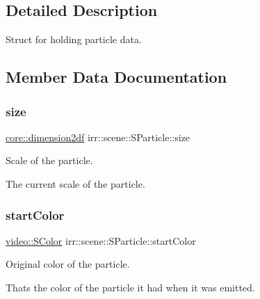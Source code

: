 \subsection{Detailed Description}
Struct for holding particle data. 

\subsection{Member Data Documentation}
\mbox{\label{structirr_1_1scene_1_1SParticle_a548dc843e9db5db26e0005a2cb29a609}} 
\subsubsection{\texorpdfstring{size}{size}}
{\footnotesize\ttfamily \hyperlink{namespaceirr_1_1core_a54f0e5b7416e6dce5a0f6213f00a580f}{core\+::dimension2df} irr\+::scene\+::\+S\+Particle\+::size}



Scale of the particle. 

The current scale of the particle. \mbox{\label{structirr_1_1scene_1_1SParticle_a23325221f845c68dd331edb38d90374f}} 
\subsubsection{\texorpdfstring{start\+Color}{startColor}}
{\footnotesize\ttfamily \hyperlink{classirr_1_1video_1_1SColor}{video\+::\+S\+Color} irr\+::scene\+::\+S\+Particle\+::start\+Color}



Original color of the particle. 

That\textquotesingle{}s the color of the particle it had when it was emitted. \mbox{\label{structirr_1_1scene_1_1SParticle_a753df7de54e742cd7d50ff10154906ee}} 
